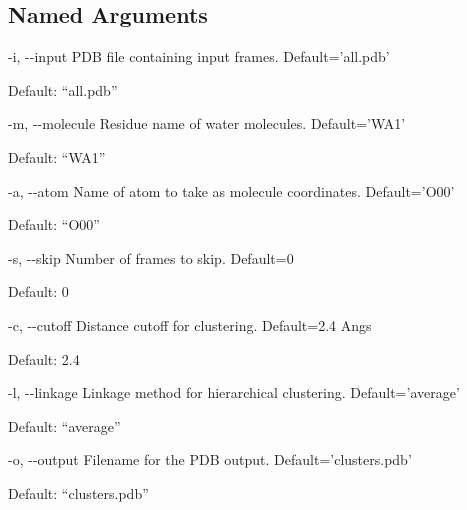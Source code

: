 \documentclass[letterpaper,10pt,english]{sphinxmanual}
\begin{document}
\subsection{Named Arguments}
\label{\detokenize{tools:Named Arguments}}\begin{optionlist}{3cm}
\item [-i, -{-}input]  
PDB file containing input frames. Default=’all.pdb’

Default: “all.pdb”
\item [-m, -{-}molecule]  
Residue name of water molecules. Default=’WA1’

Default: “WA1”
\item [-a, -{-}atom]  
Name of atom to take as molecule coordinates. Default=’O00’

Default: “O00”
\item [-s, -{-}skip]  
Number of frames to skip. Default=0

Default: 0
\item [-c, -{-}cutoff]  
Distance cutoff for clustering. Default=2.4 Angs

Default: 2.4
\item [-l, -{-}linkage]  
Linkage method for hierarchical clustering. Default=’average’

Default: “average”
\item [-o, -{-}output]  
Filename for the PDB output. Default=’clusters.pdb’

Default: “clusters.pdb”
\end{optionlist}


%
\begin{sphinxVerbatim}[commandchars=\\\{\}]
  
   
    
    
\end{sphinxVerbatim}

\end{document}
